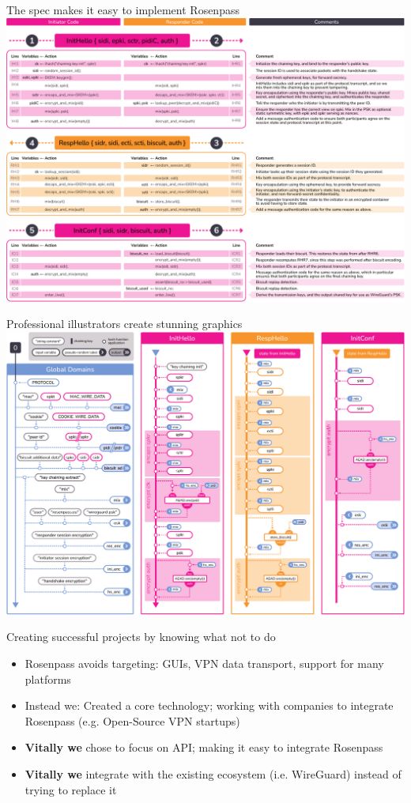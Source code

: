 \documentclass{rosenpass-beamer}
\begin{document}
\begin{frame}{The spec makes it easy to implement Rosenpass}
  \includegraphics[height=.9\textheight]{graphics/rosenpass-wp-message-handling-code.pdf}
\end{frame}

\begin{frame}{Professional illustrators create stunning graphics}
  \includegraphics[height=.9\textheight]{graphics/rosenpass-wp-hashing-tree.pdf}
\end{frame}

\begin{frame}{Creating successful projects by knowing what not to do}
\begin{itemize}
  \item Rosenpass avoids targeting: GUIs, VPN data transport, support for many platforms
  \item Instead we: Created a core technology; working with companies to integrate Rosenpass (e.g. Open-Source VPN startups)
  \item \textbf{Vitally we} chose to focus on API; making it easy to integrate Rosenpass
  \item \textbf{Vitally we} integrate with the existing ecosystem (i.e. WireGuard) instead of trying to replace it
\end{itemize}
\end{frame}
\end{document}
